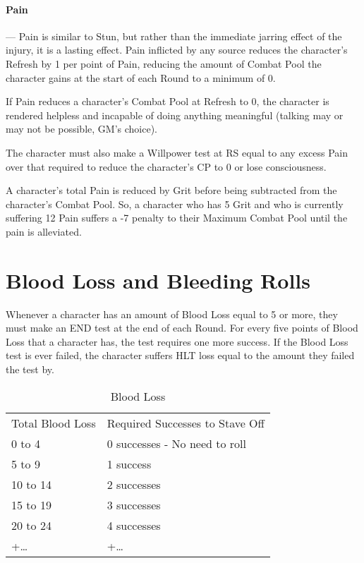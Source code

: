 \documentclass[oneside,11pt,english]{book}
\begin{document}
\paragraph{\label{sec:Pain}Pain}---\quad
Pain is similar to Stun, but rather than the immediate jarring effect of the injury, it is a lasting effect. Pain inflicted by any source reduces the character’s Refresh by 1 per point of Pain, reducing the amount of Combat Pool the character gains at the start of each Round to a minimum of 0. 

If Pain reduces a character’s Combat Pool at Refresh to 0, the character is rendered helpless and incapable of doing anything meaningful (talking may or may not be possible, GM’s choice).

The character must also make a Willpower test at RS equal to any excess Pain over that required to reduce the character’s CP to 0 or lose consciousness.

A character’s total Pain is reduced by Grit before being subtracted from the character’s Combat Pool.
So, a character who has 5 Grit and who is currently suffering 12 Pain suffers a -7 penalty to their Maximum Combat Pool until the pain is alleviated. 

\section{Blood Loss and Bleeding Rolls}
Whenever a character has an amount of Blood Loss equal to 5 or more, they must make an END test at 
the end of each Round. For every five points of Blood Loss that a character has, the test requires one more success. If the Blood Loss test is ever failed, the character suffers HLT loss equal to the amount they failed the test by.

\begin{table}[!ht]
	\centering
	\caption{Blood Loss}
	\label{tab:Blood Loss}
	\begin{tabu} spread 0pt {XX[r]}
Total Blood Loss &Required Successes to Stave Off\\
0 to 4 &0 successes - No need to roll \\
5 to 9 &1 success \\
10 to 14 &2 successes \\
15 to 19 &3 successes \\
20 to 24 &4 successes \\
+\ldots &+\ldots\\
	\end{tabu}
\end{table}
\end{document}
